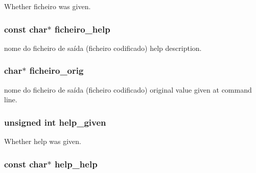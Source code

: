 Whether ficheiro was given. 

\subsubsection[{ficheiro\_\-help}]{\setlength{\rightskip}{0pt plus 5cm}const char$\ast$ {\bf ficheiro\_\-help}}\label{da/dad/structgengetopt__args__info_ac754268229530c8e58a897c4db778e0a}


nome do ficheiro de saída (ficheiro codificado) help description. 

\subsubsection[{ficheiro\_\-orig}]{\setlength{\rightskip}{0pt plus 5cm}char$\ast$ {\bf ficheiro\_\-orig}}\label{da/dad/structgengetopt__args__info_af263b0e7f4717673bc643fd2eca56298}


nome do ficheiro de saída (ficheiro codificado) original value given at command line. 

\subsubsection[{help\_\-given}]{\setlength{\rightskip}{0pt plus 5cm}unsigned int {\bf help\_\-given}}\label{da/dad/structgengetopt__args__info_ae7b585cbe114b59b6ae6d4047f01f970}


Whether help was given. 

\subsubsection[{help\_\-help}]{\setlength{\rightskip}{0pt plus 5cm}const char$\ast$ {\bf help\_\-help}}\label{da/dad/structgengetopt__args__info_a05a8043a609675a96738762fb47931e9}


